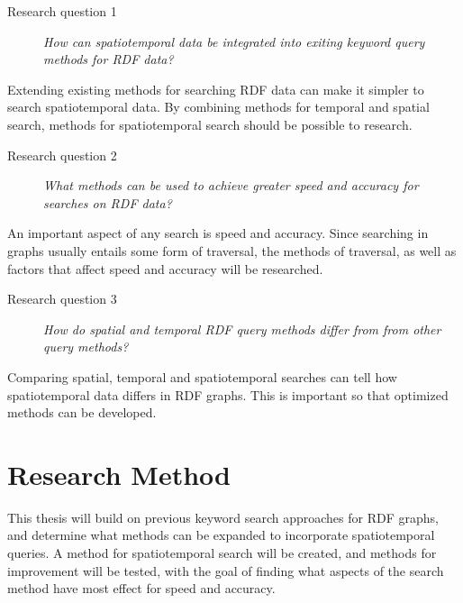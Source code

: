 \begin{description}
    \item[Research question 1] {\em How can spatiotemporal data be integrated into exiting keyword query methods for RDF data?}
\end{description}
Extending existing methods for searching RDF data can make it simpler to search spatiotemporal data. By combining methods for temporal and spatial search, methods for spatiotemporal search should be possible to research.

\begin{description}
    \item[Research question 2] {\em What methods can be used to achieve greater speed and accuracy for searches on RDF data?}
\end{description}
An important aspect of any search is speed and accuracy. Since searching in graphs usually entails some form of traversal, the methods of traversal, as well as factors that affect speed and accuracy will be researched.

\begin{description}
    \item[Research question 3] {\em How do spatial and temporal RDF query methods differ from from other query methods?}
\end{description}
Comparing spatial, temporal and spatiotemporal searches can tell how spatiotemporal data differs in RDF graphs. This is important so that optimized methods can be developed.

\section{Research Method}
\label{sec:researchMethod}
This thesis will build on previous keyword search approaches for RDF graphs, and determine what methods can be expanded to incorporate spatiotemporal queries. A method for spatiotemporal search will be created, and methods for improvement will be tested, with the goal of finding what aspects of the search method have most effect for speed and accuracy.

\glsresetall